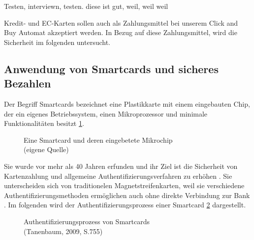 Testen, interviewn, testen. diese ist gut, weil, weil weil

Kredit- und EC-Karten sollen auch als Zahlungsmittel bei unserem Click and Buy Automat
akzeptiert werden. In Bezug auf diese Zahlungsmittel, wird die Sicherheit im folgenden untersucht.


\subsection{Anwendung von Smartcards und sicheres Bezahlen}
Der Begriff Smartcards bezeichnet eine Plastikkarte mit einem eingebauten Chip, der ein eigenes 
Betriebssystem, einen Mikroprozessor und minimale Funktionalitäten besitzt \ref{fig:eigenes_Bild}. 

\vfill
\begin{figure}[H]
   \caption{Eine Smartcard und deren eingebetete Mikrochip\\(eigene Quelle)}
   \label{fig:eigenes_Bild}
\end{figure}
\vfill

Sie wurde vor mehr als 40 Jahren erfunden und ihr Ziel ist die Sicherheit von Kartenzahlung und allgemeine
Authentifizierungsverfahren zu erhöhen \cite{refip:JFSB}. Sie unterscheiden sich von traditionelen 
Magnetstreifenkarten, weil sie verschiedene Authentifizierungsmethoden ermöglichen auch ohne direkte 
Verbindung zur Bank \cite{refbook:ATMS}. Im folgenden wird der Authentifizierungsprozess einer Smartcard 
\ref{fig:refbook_ATMS} dargestellt. 


\vfill
\begin{figure}[H]
   \caption{Authentifizierungsprozess von Smartcards\\(Tanenbaum, 2009, S.755)}
   \label{fig:refbook_ATMS}
\end{figure}
\vfill

